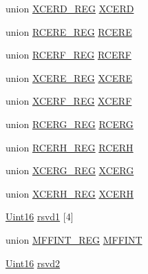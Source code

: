 \begin{DoxyCompactItemize}
\item 
union \hyperlink{union_x_c_e_r_d___r_e_g}{X\+C\+E\+R\+D\+\_\+\+R\+E\+G} \hyperlink{struct_m_c_b_s_p___r_e_g_s_a14eb5ad610ad5b5488e491590d6adce1}{X\+C\+E\+R\+D}
\item 
union \hyperlink{union_r_c_e_r_e___r_e_g}{R\+C\+E\+R\+E\+\_\+\+R\+E\+G} \hyperlink{struct_m_c_b_s_p___r_e_g_s_a79869b5866813faa040686bb7901f05b}{R\+C\+E\+R\+E}
\item 
union \hyperlink{union_r_c_e_r_f___r_e_g}{R\+C\+E\+R\+F\+\_\+\+R\+E\+G} \hyperlink{struct_m_c_b_s_p___r_e_g_s_a0a6408976bc974555dcc0a53482dbc79}{R\+C\+E\+R\+F}
\item 
union \hyperlink{union_x_c_e_r_e___r_e_g}{X\+C\+E\+R\+E\+\_\+\+R\+E\+G} \hyperlink{struct_m_c_b_s_p___r_e_g_s_ae63ecf9c2aa91666900e8c16dad7875c}{X\+C\+E\+R\+E}
\item 
union \hyperlink{union_x_c_e_r_f___r_e_g}{X\+C\+E\+R\+F\+\_\+\+R\+E\+G} \hyperlink{struct_m_c_b_s_p___r_e_g_s_a421c1eb8900f754bd9f036d30a2968e0}{X\+C\+E\+R\+F}
\item 
union \hyperlink{union_r_c_e_r_g___r_e_g}{R\+C\+E\+R\+G\+\_\+\+R\+E\+G} \hyperlink{struct_m_c_b_s_p___r_e_g_s_a29fed4854110f1437a4e11de08253082}{R\+C\+E\+R\+G}
\item 
union \hyperlink{union_r_c_e_r_h___r_e_g}{R\+C\+E\+R\+H\+\_\+\+R\+E\+G} \hyperlink{struct_m_c_b_s_p___r_e_g_s_a1bfa8507b7962cdbd0a0d43d4458f59a}{R\+C\+E\+R\+H}
\item 
union \hyperlink{union_x_c_e_r_g___r_e_g}{X\+C\+E\+R\+G\+\_\+\+R\+E\+G} \hyperlink{struct_m_c_b_s_p___r_e_g_s_aa10dc6495037beec9f9d72928b67625d}{X\+C\+E\+R\+G}
\item 
union \hyperlink{union_x_c_e_r_h___r_e_g}{X\+C\+E\+R\+H\+\_\+\+R\+E\+G} \hyperlink{struct_m_c_b_s_p___r_e_g_s_a74bbdd93d85309d200efea8435ab2a0e}{X\+C\+E\+R\+H}
\item 
\hyperlink{_d_s_p2833x___device_8h_a59a9f6be4562c327cbfb4f7e8e18f08b}{Uint16} \hyperlink{struct_m_c_b_s_p___r_e_g_s_a5d025e4e26740643656e288b90f6eccd}{rsvd1} \mbox{[}4\mbox{]}
\item 
union \hyperlink{union_m_f_f_i_n_t___r_e_g}{M\+F\+F\+I\+N\+T\+\_\+\+R\+E\+G} \hyperlink{struct_m_c_b_s_p___r_e_g_s_a3b33280ba0c56ed0b3184793f11527b4}{M\+F\+F\+I\+N\+T}
\item 
\hyperlink{_d_s_p2833x___device_8h_a59a9f6be4562c327cbfb4f7e8e18f08b}{Uint16} \hyperlink{struct_m_c_b_s_p___r_e_g_s_aeb77088b271058e35e785519dd628c14}{rsvd2}
\end{DoxyCompactItemize}


